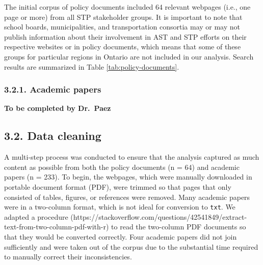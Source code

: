 \documentclass[]{elsarticle} %
\begin{document}
The initial corpus of policy documents included 64 relevant webpages
(i.e., one page or more) from all STP stakeholder groups. It is
important to note that school boards, municipalities, and transportation
consortia may or may not publish information about their involvement in
AST and STP efforts on their respective websites or in policy documents,
which means that some of these groups for particular regions in Ontario
are not included in our analysis. Search results are summarized in Table
\ref{tab:policy-documents}.

\begin{table}

\caption{\label{tab:policy-documents}\label{tab:search-results}Search results from the main STP stakeholder groups.}
\centering
{}
\end{table}

\hypertarget{academic-papers}{%
\subsubsection{3.2.1. Academic papers}\label{academic-papers}}

\textbf{To be completed by Dr.~Paez}

\hypertarget{data-cleaning}{%
\subsection{3.2. Data cleaning}\label{data-cleaning}}

A multi-step process was conducted to ensure that the analysis captured
as much content as possible from both the policy documents (n = 64) and
academic papers (n = 233). To begin, the webpages, which were manually
downloaded in portable document format (PDF), were trimmed so that pages
that only consisted of tables, figures, or references were removed. Many
academic papers were in a two-column format, which is not ideal for
conversion to \texttt{txt}. We adapted a procedure
(https://stackoverflow.com/questions/42541849/extract-text-from-two-column-pdf-with-r)
to read the two-column PDF documents so that they would be converted
correctly. Four academic papers did not join sufficiently and were taken
out of the corpus due to the substantial time required to manually
correct their inconsistencies.
\end{document}
